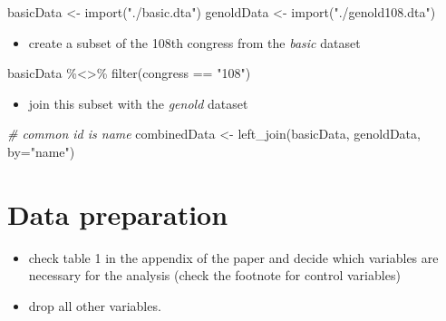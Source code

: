 \documentclass[
]{article}
\newenvironment{Shaded}{\begin{snugshade}}{\end{snugshade}}
\newcommand{\AttributeTok}[1]{\textcolor[rgb]{0.77,0.63,0.00}{#1}}
\newcommand{\CommentTok}[1]{\textcolor[rgb]{0.56,0.35,0.01}{\textit{#1}}}
\newcommand{\FunctionTok}[1]{\textcolor[rgb]{0.00,0.00,0.00}{#1}}
\newcommand{\NormalTok}[1]{#1}
\newcommand{\OtherTok}[1]{\textcolor[rgb]{0.56,0.35,0.01}{#1}}
\newcommand{\SpecialCharTok}[1]{\textcolor[rgb]{0.00,0.00,0.00}{#1}}
\newcommand{\StringTok}[1]{\textcolor[rgb]{0.31,0.60,0.02}{#1}}
\providecommand{\tightlist}{%
  \setlength{\itemsep}{0pt}\setlength{\parskip}{0pt}}
\begin{document}
\begin{Shaded}
\begin{Highlighting}[]
\NormalTok{basicData }\OtherTok{\textless{}{-}} \FunctionTok{import}\NormalTok{(}\StringTok{"./basic.dta"}\NormalTok{)}
\NormalTok{genoldData }\OtherTok{\textless{}{-}} \FunctionTok{import}\NormalTok{(}\StringTok{"./genold108.dta"}\NormalTok{)}
\end{Highlighting}
\end{Shaded}

\begin{itemize}
\tightlist
\item
  create a subset of the 108th congress from the \emph{basic} dataset
\end{itemize}

\begin{Shaded}
\begin{Highlighting}[]
\NormalTok{basicData }\SpecialCharTok{\%\textless{}\textgreater{}\%} \FunctionTok{filter}\NormalTok{(congress }\SpecialCharTok{==} \StringTok{"108"}\NormalTok{)}
\end{Highlighting}
\end{Shaded}

\begin{itemize}
\tightlist
\item
  join this subset with the \emph{genold} dataset
\end{itemize}

\begin{Shaded}
\begin{Highlighting}[]
\CommentTok{\# common id is name}
\NormalTok{combinedData }\OtherTok{\textless{}{-}} \FunctionTok{left\_join}\NormalTok{(basicData, genoldData, }\AttributeTok{by=}\StringTok{"name"}\NormalTok{)}
\end{Highlighting}
\end{Shaded}

\hypertarget{data-preparation}{%
\section{Data preparation}\label{data-preparation}}

\begin{itemize}
\tightlist
\item
  check table 1 in the appendix of the paper and decide which variables
  are necessary for the analysis (check the footnote for control
  variables)
\item
  drop all other variables.
\end{itemize}
\end{document}
